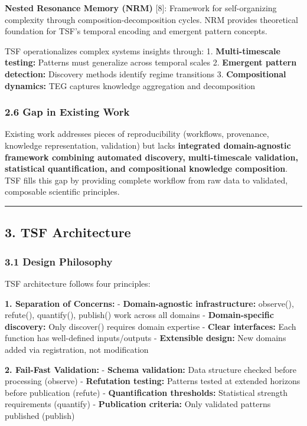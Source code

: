 \documentclass[
]{article}
\begin{document}
\textbf{Nested Resonance Memory (NRM)} {[}8{]}: Framework for
self-organizing complexity through composition-decomposition cycles. NRM
provides theoretical foundation for TSF's temporal encoding and emergent
pattern concepts.

TSF operationalizes complex systems insights through: 1.
\textbf{Multi-timescale testing:} Patterns must generalize across
temporal scales 2. \textbf{Emergent pattern detection:} Discovery
methods identify regime transitions 3. \textbf{Compositional dynamics:}
TEG captures knowledge aggregation and decomposition

\subsubsection{2.6 Gap in Existing Work}\label{gap-in-existing-work}

Existing work addresses pieces of reproducibility (workflows,
provenance, knowledge representation, validation) but lacks
\textbf{integrated domain-agnostic framework combining automated
discovery, multi-timescale validation, statistical quantification, and
compositional knowledge composition}. TSF fills this gap by providing
complete workflow from raw data to validated, composable scientific
principles.

\begin{center}\rule{0.5\linewidth}{0.5pt}\end{center}

\subsection{3. TSF Architecture}\label{tsf-architecture}

\subsubsection{3.1 Design Philosophy}\label{design-philosophy}

TSF architecture follows four principles:

\textbf{1. Separation of Concerns:} - \textbf{Domain-agnostic
infrastructure:} observe(), refute(), quantify(), publish() work across
all domains - \textbf{Domain-specific discovery:} Only discover()
requires domain expertise - \textbf{Clear interfaces:} Each function has
well-defined inputs/outputs - \textbf{Extensible design:} New domains
added via registration, not modification

\textbf{2. Fail-Fast Validation:} - \textbf{Schema validation:} Data
structure checked before processing (observe) - \textbf{Refutation
testing:} Patterns tested at extended horizons before publication
(refute) - \textbf{Quantification thresholds:} Statistical strength
requirements (quantify) - \textbf{Publication criteria:} Only validated
patterns published (publish)
\end{document}
